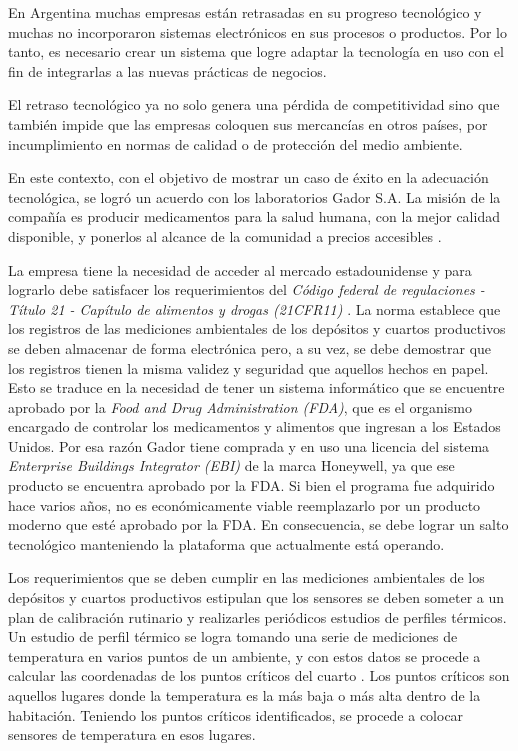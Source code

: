 En Argentina muchas empresas están retrasadas en su progreso tecnológico y muchas no incorporaron sistemas electrónicos en sus procesos o productos.
Por lo tanto, es necesario crear un sistema que logre adaptar la tecnología en uso con el fin de integrarlas a las nuevas prácticas de negocios.

El retraso tecnológico ya no solo genera una pérdida de competitividad sino que también impide que las empresas coloquen sus mercancías en otros países, por incumplimiento en normas de calidad o de protección del medio ambiente.
		
En este contexto, con el objetivo de mostrar un caso de éxito en la adecuación tecnológica, se logró un acuerdo con los laboratorios Gador S.A.
La misión de la compañía es producir medicamentos para la salud humana, con la mejor calidad disponible, y ponerlos al alcance de la comunidad a precios accesibles \citep{WEBSITE:Gador}.

La empresa tiene la necesidad de acceder al mercado estadounidense y para lograrlo debe satisfacer los requerimientos del \emph{Código federal de regulaciones - Título 21 - Capítulo de alimentos y drogas (21CFR11)} \citep{ARTICLE:21cfr11}.
La norma establece que los registros de las mediciones ambientales de los depósitos y cuartos productivos se deben almacenar de forma electrónica pero, a su vez, se debe demostrar que los registros tienen la misma validez y seguridad que aquellos hechos en papel. 
Esto se traduce en la necesidad de tener un sistema informático que se encuentre aprobado por la \emph{Food and Drug Administration (FDA)}, que es el organismo encargado de controlar los medicamentos y alimentos que ingresan a los Estados Unidos.
Por esa razón Gador tiene comprada y en uso una licencia del sistema \emph{Enterprise Buildings Integrator (EBI)} \citep{WEBSITE:HoneywellEBI600} de la marca Honeywell, ya que ese producto se encuentra aprobado por la FDA. 
Si bien el programa fue adquirido hace varios años, no es económicamente viable reemplazarlo por un producto moderno que esté aprobado por la FDA.
En consecuencia, se debe lograr un salto tecnológico manteniendo la plataforma que actualmente está operando.

Los requerimientos que se deben cumplir en las mediciones ambientales de los depósitos y cuartos productivos estipulan que los sensores se deben someter a un plan de calibración rutinario y realizarles periódicos estudios de perfiles térmicos.
Un estudio de perfil térmico se logra tomando una serie de mediciones de temperatura en varios puntos de un ambiente, y con estos datos se procede a calcular las coordenadas de los puntos críticos del cuarto \citep{ARTICLE:Temperature}.
Los puntos críticos son aquellos lugares donde la temperatura es la más baja o más alta dentro de la habitación.
Teniendo los puntos críticos identificados, se procede a colocar sensores de temperatura en esos lugares.

